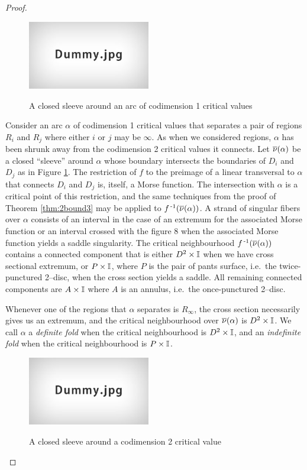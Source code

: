 \begin{proof}
	\begin{figure}
		\centering
		\caption{A closed sleeve around an arc of codimension 1 critical values}
		\includegraphics[height=3cm]{figures/dummy.jpg}
		\label{fig:arcsleeve}
	\end{figure}
	
	Consider an arc $\alpha$ of codimension 1 critical values that separates a pair of regions $R_i$ and $R_j$ where either $i$ or $j$ may be $\infty$.
	As when we considered regions, $\alpha$ has been shrunk away from the codimension 2 critical values it connects.
	Let $\overline{\nu}(\alpha)$ be a closed ``sleeve'' around $\alpha$ whose boundary intersects the boundaries of $D_i$ and $D_j$ as in Figure \ref{fig:arcsleeve}.
	The restriction of $f$ to the preimage of a linear transversal to $\alpha$ that connects $D_i$ and $D_j$ is, itself, a Morse function.
	The intersection with $\alpha$ is a critical point of this restriction, and the same techniques from the proof of Theorem \ref{thm:2bound3} may be applied to $f^{\,\text{-}1}(\overline{\nu}(\alpha))$.
	A strand of singular fibers over $\alpha$ consists of an interval in the case of an extremum for the associated Morse function or an interval crossed with the figure 8 when the associated Morse function yields a saddle singularity.
	The critical neighbourhood $f^{\,\text{-}1}(\overline{\nu}(\alpha))$ contains a connected component that is either $D^2\times\mathbb{I}$ when we have cross sectional extremum, or $P\times\mathbb{I}$, where $P$ is the pair of pants surface, i.e.\ the twice-punctured 2--disc, when the cross section yields a saddle.
	All remaining connected components are $A\times\mathbb{I}$ where $A$ is an annulus, i.e.\ the once-punctured 2--disc.
	
	Whenever one of the regions that $\alpha$ separates is $R_\infty$, the cross section necessarily gives us an extremum, and the critical neighbourhood over $\overline{\nu}(\alpha)$ is $D^2\times\mathbb{I}$.
	We call $\alpha$ a \emph{definite fold} when the critical neighbourhood is $D^2\times\mathbb{I}$, and an \emph{indefinite fold} when the critical neighbourhood is $P\times\mathbb{I}$.
	
	\begin{figure}
		\centering
		\caption{A closed sleeve around a codimension 2 critical value}
		\includegraphics[height=3cm]{figures/dummy.jpg}
		\label{fig:isolatesleeve}
	\end{figure}
	

\end{proof}
